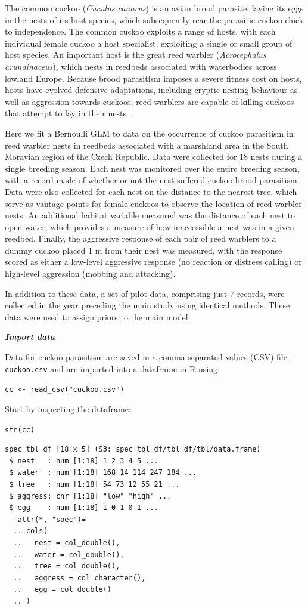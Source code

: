\documentclass[
]{book}
\begin{document}
The common cuckoo (\emph{Cuculus canorus}) is an avian brood parasite, laying its eggs in the nests of its host species, which subsequently rear the parasitic cuckoo chick to independence. The common cuckoo exploits a range of hosts, with each individual female cuckoo a host specialist, exploiting a single or small group of host species. An important host is the great reed warbler (\emph{Acrocephalus arundinaceus}), which nests in reedbeds associated with waterbodies across lowland Europe. Because brood parasitism imposes a severe fitness cost on hosts, hosts have evolved defensive adaptations, including cryptic nesting behaviour as well as aggression towards cuckoos; reed warblers are capable of killing cuckoos that attempt to lay in their nests \citep{_ulc_2020}.

Here we fit a Bernoulli GLM to data on the occurrence of cuckoo parasitism in reed warbler nests in reedbeds associated with a marshland area in the South Moravian region of the Czech Republic. Data were collected for 18 nests during a single breeding season. Each nest was monitored over the entire breeding season, with a record made of whether or not the nest suffered cuckoo brood parasitism. Data were also collected for each nest on the distance to the nearest tree, which serve as vantage points for female cuckoos to observe the location of reed warbler nests. An additional habitat variable measured was the distance of each nest to open water, which provides a measure of how inaccessible a nest was in a given reedbed. Finally, the aggressive response of each pair of reed warblers to a dummy cuckoo placed 1 m from their nest was measured, with the response scored as either a low-level aggressive response (no reaction or distress calling) or high-level aggression (mobbing and attacking).

In addition to these data, a set of pilot data, comprising just 7 records, were collected in the year preceding the main study using identical methods. These data were used to assign priors to the main model.

\emph{\textbf{Import data}}

Data for cuckoo parasitism are saved in a comma-separated values (CSV) file \texttt{cuckoo.csv} and are imported into a dataframe in R using:

\texttt{cc\ \textless{}-\ read\_csv("cuckoo.csv")}

Start by inspecting the dataframe:

\texttt{str(cc)}

\begin{verbatim}
spec_tbl_df [18 x 5] (S3: spec_tbl_df/tbl_df/tbl/data.frame)
 $ nest   : num [1:18] 1 2 3 4 5 ...
 $ water  : num [1:18] 168 14 114 247 184 ...
 $ tree   : num [1:18] 54 73 12 55 21 ...
 $ aggress: chr [1:18] "low" "high" ...
 $ egg    : num [1:18] 1 0 1 0 1 ...
 - attr(*, "spec")=
  .. cols(
  ..   nest = col_double(),
  ..   water = col_double(),
  ..   tree = col_double(),
  ..   aggress = col_character(),
  ..   egg = col_double()
  .. )
\end{verbatim}
\end{document}
